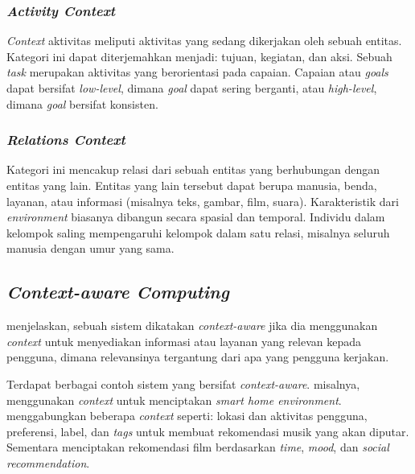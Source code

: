 \subsubsection{\textit{Activity Context}}
\label{sssec:activity-context}
\textit{Context} aktivitas meliputi aktivitas yang sedang dikerjakan oleh sebuah entitas. Kategori ini dapat diterjemahkan menjadi: tujuan, kegiatan, dan aksi. Sebuah \textit{task} merupakan aktivitas yang berorientasi pada capaian. Capaian atau \textit{goals} dapat bersifat \textit{low-level}, dimana \textit{goal} dapat sering berganti, atau \textit{high-level}, dimana \textit{goal} bersifat konsisten.


\subsubsection{\textit{Relations Context}}
\label{sssec:relations-context}
Kategori ini mencakup relasi dari sebuah entitas yang berhubungan dengan entitas yang lain. Entitas yang lain tersebut dapat berupa manusia, benda, layanan, atau informasi (misalnya teks, gambar, film, suara). Karakteristik dari \textit{environment} biasanya dibangun secara spasial dan temporal. Individu dalam kelompok saling mempengaruhi kelompok dalam satu relasi, misalnya seluruh manusia dengan umur yang sama.


\subsection{\textit{Context-aware Computing}}
\label{ssec:context-aware-computing}
\citep{dey_understanding_2001} menjelaskan, sebuah sistem dikatakan \textit{context-aware} jika dia menggunakan \textit{context} untuk menyediakan informasi atau layanan yang relevan kepada pengguna, dimana relevansinya tergantung dari apa yang pengguna kerjakan.


Terdapat berbagai contoh sistem yang bersifat \textit{context-aware}. \citep{tsai_context-aware_2016} misalnya, menggunakan \textit{context} untuk menciptakan \textit{smart home environment}. \citep{magara_mplist:_2016} menggabungkan beberapa \textit{context} seperti: lokasi dan aktivitas pengguna, preferensi, label, dan \textit{tags} untuk membuat rekomendasi musik yang akan diputar. Sementara \citep{said_introduction_2013} menciptakan rekomendasi film berdasarkan \textit{time}, \textit{mood}, dan \textit{social recommendation}.


